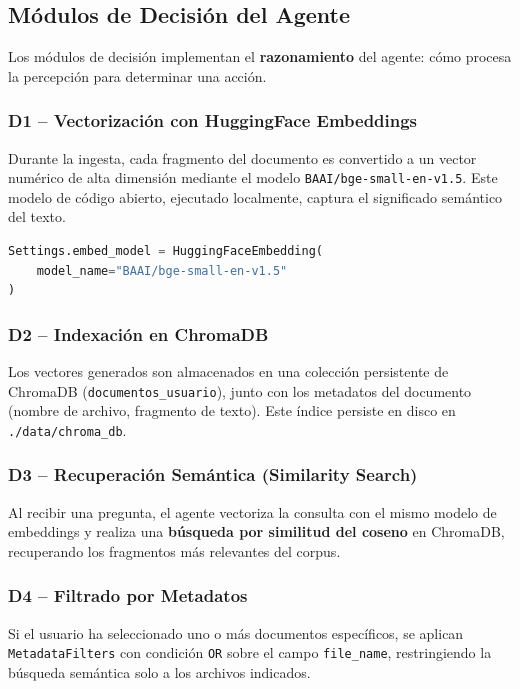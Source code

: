 \documentclass[12pt,a4paper]{article}
\begin{document}
\subsection{Módulos de Decisión del Agente}

Los módulos de decisión implementan el \textbf{razonamiento} del agente: cómo procesa la percepción para determinar una acción.

\subsubsection{D1 -- Vectorización con HuggingFace Embeddings}

Durante la ingesta, cada fragmento del documento es convertido a un vector numérico de alta dimensión mediante el modelo \texttt{BAAI/bge-small-en-v1.5}. Este modelo de código abierto, ejecutado localmente, captura el significado semántico del texto.

\begin{lstlisting}[language=Python, caption={Configuración del modelo de embeddings.}]
Settings.embed_model = HuggingFaceEmbedding(
    model_name="BAAI/bge-small-en-v1.5"
)
\end{lstlisting}

\subsubsection{D2 -- Indexación en ChromaDB}

Los vectores generados son almacenados en una colección persistente de ChromaDB (\texttt{documentos\_usuario}), junto con los metadatos del documento (nombre de archivo, fragmento de texto). Este índice persiste en disco en \texttt{./data/chroma\_db}.

\subsubsection{D3 -- Recuperación Semántica (Similarity Search)}

Al recibir una pregunta, el agente vectoriza la consulta con el mismo modelo de embeddings y realiza una \textbf{búsqueda por similitud del coseno} en ChromaDB, recuperando los fragmentos más relevantes del corpus.

\subsubsection{D4 -- Filtrado por Metadatos}

Si el usuario ha seleccionado uno o más documentos específicos, se aplican \texttt{MetadataFilters} con condición \texttt{OR} sobre el campo \texttt{file\_name}, restringiendo la búsqueda semántica solo a los archivos indicados.
\end{document}
